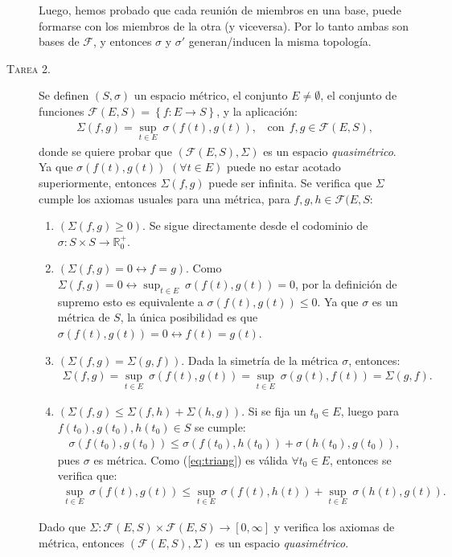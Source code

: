 \documentclass[spanish, fleqn]{article}
\begin{document}
\begin{description}
	Luego, hemos probado que cada reunión de miembros en una base, puede formarse con los miembros de la otra (y viceversa). Por lo tanto ambas son bases de $\mathcal{F}$, y entonces $\sigma$ y $\sigma'$ generan/inducen la misma topología.




	\item[\textsc{Tarea 2.}] Se definen $(S,\sigma)$ un espacio métrico, el conjunto $E \neq \emptyset$, el conjunto de funciones $\mathcal{F}(E,S) = \left\{f: E \rightarrow S \right\}$, y la aplicación:
	\begin{align*}
		\Sigma(f,g) = \sup_{t \in E}\ \sigma \left(f(t),g(t)\right), \ \ \ \ \text{con} \ \ f,g \in \mathcal{F}(E,S),
	\end{align*}
	donde se quiere probar que $(\mathcal{F}(E,S),\Sigma)$ es un espacio \textit{quasimétrico}. Ya que $\sigma \left(f(t),g(t)\right)$ $(\forall t \in E)$ puede no estar acotado superiormente, entonces $\Sigma(f,g)$ puede ser infinita. Se verifica que $\Sigma$ cumple los axiomas usuales para una métrica, para $f,g,h \in \mathcal{F}(E,S$:
	\begin{enumerate}
	 	\item $\left(\Sigma(f,g) \geq 0 \right)$. Se sigue directamente desde el codominio de $\sigma : S \times S \rightarrow \mathbb{R}_0^+$.
	 	\item $\left(\Sigma(f,g) = 0 \leftrightarrow f=g \right)$. Como $\Sigma(f,g) = 0 \leftrightarrow \displaystyle \sup_{t \in E} \  \sigma\left(f(t), g(t) \right) = 0$, por la definición de supremo esto es equivalente a $\sigma\left( f(t), g(t) \right) \leq 0$. Ya que $\sigma$ es un métrica de $S$, la única posibilidad es que $\sigma\left(f(t),g(t)\right)=0 \leftrightarrow f(t) = g(t)$.
	 	\item $\left(\Sigma(f,g) = \Sigma(g,f) \right)$. Dada la simetría de la métrica $\sigma$, entonces:
	 	\begin{align*}
	 		\Sigma(f,g) = \sup_{t \in E} \ \sigma\left(f(t), g(t) \right) = \sup_{t \in E} \ \sigma\left(g(t), f(t) \right) = \Sigma(g,f).
	 	\end{align*}
	 	\item $\left(\Sigma(f,g) \leq \Sigma(f,h) + \Sigma(h,g) \right)$. Si se fija un $t_0 \in E$, luego para $f(t_0), g(t_0), h(t_0) \in S$ se cumple:
	 	\begin{align}
	 		\sigma\left(f(t_0), g(t_0) \right) \leq \sigma\left(f(t_0), h(t_0) \right) + \sigma\left(h(t_0), g(t_0) \right),
	 	\label{eq:triang}
	 	\end{align}
	 	pues $\sigma$ es métrica. Como (\ref{eq:triang}) es válida $\forall t_0 \in E$, entonces se verifica que:
	 	\begin{align*}
	 		\sup_{t\in E} \ \sigma\left(f(t), g(t) \right) \leq \sup_{t\in E} \ \sigma\left(f(t), h(t) \right) + \sup_{t\in E} \ \sigma\left(h(t), g(t) \right).
	 	\end{align*}
	\end{enumerate}
	Dado que $\Sigma: \mathcal{F}(E,S) \times \mathcal{F}(E,S) \rightarrow [0,\infty]$ y verifica los axiomas de métrica, entonces $\left(\mathcal{F}(E,S), \Sigma \right)$ es un espacio \textit{quasimétrico}.




\end{description}
\end{document}
